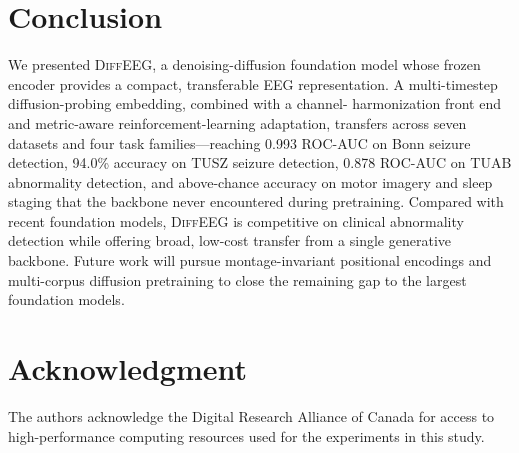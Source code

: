 \documentclass[journal]{IEEEtran}
\begin{document}
\section{Conclusion}
We presented \textsc{DiffEEG}, a denoising-diffusion foundation model whose
frozen encoder provides a compact, transferable EEG representation. A
multi-timestep diffusion-probing embedding, combined with a channel-
harmonization front end and metric-aware reinforcement-learning adaptation,
transfers across seven datasets and four task families---reaching \num{0.993}
ROC-AUC on Bonn seizure detection, \num{94.0}\% accuracy on TUSZ seizure
detection, \num{0.878} ROC-AUC on TUAB abnormality detection, and above-chance
accuracy on motor imagery and sleep staging that the backbone never encountered
during pretraining. Compared with recent foundation
models, \textsc{DiffEEG} is competitive on clinical abnormality detection while
offering broad, low-cost transfer from a single generative backbone. Future work
will pursue montage-invariant positional encodings and multi-corpus diffusion
pretraining to close the remaining gap to the largest foundation models.

\section*{Acknowledgment}
The authors acknowledge the Digital Research Alliance of Canada for access to
high-performance computing resources used for the experiments in this study.
\end{document}
